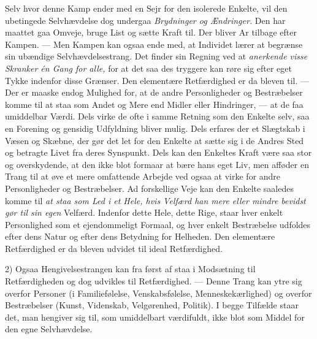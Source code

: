 \documentclass[12pt,a4paper,openany]{book}
\newcommand{\opage}[1]{\marginnote{\footnotesize\textit{[#1]}}}
\begin{document}
Selv hvor denne Kamp ender med en Sejr for den isolerede
Enkelte, vil den ubetingede Selvhævdelse dog undergaa \textit{Brydninger
og Ændringer.} Den har maattet gaa Omveje, bruge List
og sætte Kraft til. Der bliver Ar tilbage efter Kampen. --- Men
Kampen kan ogsaa ende med, at Individet lærer at begrænse
sin ubændige Selvhævdelsestrang. Det finder sin Regning ved
\setcounter{footnote}{0}%
\opage{58}at \textit{anerkende visse Skranker én Gang for alle,} for at det saa des
tryggere kan røre sig efter eget Tykke indenfor disse Grænser.
Den elementære Retfærdighed er da bleven til. --- Der er maaske
endog Mulighed for, at de andre Personligheder og Bestræbelser
komme til at staa som Andet og Mere end Midler eller Hindringer,
--- at de faa umiddelbar Værdi. Dels virke de ofte i
samme Retning som den Enkelte selv, saa en Forening og gensidig
Udfyldning bliver mulig. Dels erfares der et Slægtskab i
Væsen og Skæbne, der gør det let for den Enkelte at sætte sig
i de Andres Sted og betragte Livet fra deres Synspunkt. Dels
kan den Enkeltes Kraft være saa stor og overskydende, at den
ikke blot formaar at bære hans eget Liv, men afføder en Trang
til at øve et mere omfattende Arbejde ved ogsaa at virke for
andre Personligheder og Bestræbelser. Ad forskellige Veje kan
den Enkelte saaledes komme til \textit{at staa som Led i et Hele, hvis
Velfærd han mere eller mindre bevidst gør til sin egen} Velfærd.
Indenfor dette Hele, dette Rige, staar hver enkelt Personlighed
som et ejendommeligt Formaal, og hver enkelt Bestræbelse udfoldes
efter dens Natur og efter dens Betydning for Helheden.
Den elementære Retfærdighed er da bleven udvidet til ideal
Retfærdighed.

2) Ogsaa Hengivelsestrangen kan fra først af staa i Modsætning
til Retfærdigheden og dog udvikles til Retfærdighed. ---
Denne Trang kan ytre sig overfor Personer (i Familiefølelse, Venskabsfølelse,
Menneskekærlighed) og overfor Bestræbelser (Kunst,
Videnskab, Velgørenhed, Politik). I begge Tilfælde staar det,
man hengiver sig til, som umiddelbart værdifuldt, ikke blot som
Middel for den egne Selvhævdelse.
\end{document}
